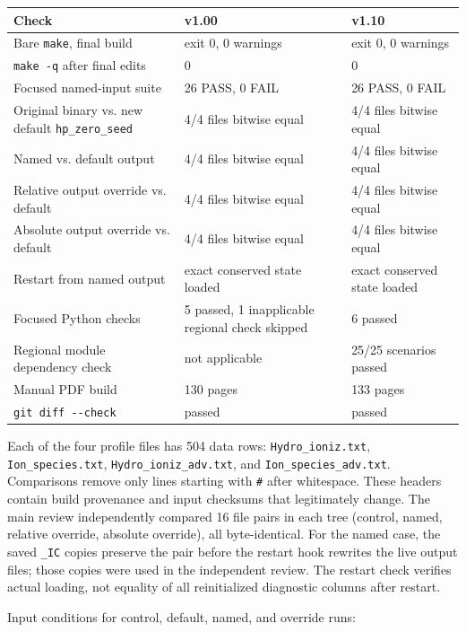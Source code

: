 \documentclass[english,a4paper]{my_memo}
\begin{document}
{\def\LTcaptype{none} %
{\small
\begin{longtable}[]{@{}lll@{}}
\toprule\noalign{}
Check & v1.00 & v1.10 \\
\midrule\noalign{}
\endhead
\bottomrule\noalign{}
\endlastfoot
Bare \texttt{make}, final build & exit 0, 0 warnings & exit 0, 0 warnings \\
\texttt{make\ -q} after final edits & 0 & 0 \\
Focused named-input suite & 26 PASS, 0 FAIL & 26 PASS, 0 FAIL \\
Original binary vs. new default \texttt{hp\_zero\_seed} & 4/4 files bitwise equal & 4/4 files bitwise equal \\
Named vs. default output & 4/4 files bitwise equal & 4/4 files bitwise equal \\
Relative output override vs. default & 4/4 files bitwise equal & 4/4 files bitwise equal \\
Absolute output override vs. default & 4/4 files bitwise equal & 4/4 files bitwise equal \\
Restart from named output & exact conserved state loaded & exact conserved state loaded \\
Focused Python checks & 5 passed, 1 inapplicable regional check skipped & 6 passed \\
Regional module dependency check & not applicable & 25/25 scenarios passed \\
Manual PDF build & 130 pages & 133 pages \\
\texttt{git\ diff\ -\/-check} & passed & passed \\
\end{longtable}
}
}

Each of the four profile files has 504 data rows: \texttt{Hydro\_ioniz.txt},
\texttt{Ion\_species.txt}, \texttt{Hydro\_ioniz\_adv.txt}, and \texttt{Ion\_species\_adv.txt}.
Comparisons remove only lines starting with \texttt{\#} after whitespace. These
headers contain build provenance and input checksums that legitimately
change. The main review independently compared 16 file pairs in each tree
(control, named, relative override, absolute override), all byte-identical.
For the named case, the saved \texttt{\_IC} copies preserve the pair before the
restart hook rewrites the live output files; those copies were used in the
independent review. The restart check verifies actual loading, not equality
of all reinitialized diagnostic columns after restart.

Input conditions for control, default, named, and override runs:
\end{document}
